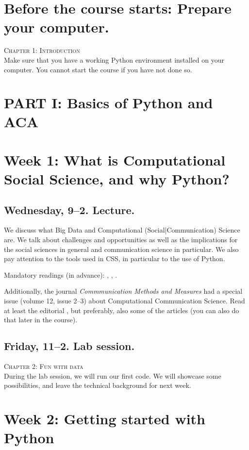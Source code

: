 \section*{Before the course starts: Prepare your computer.}
\textsc{ Chapter 1: Introduction}\\
Make sure that you have a working Python environment installed on your computer. You cannot start the course if you have not done so.

\section*{PART I: Basics of Python and ACA}

\section*{Week 1: What is Computational Social Science, and why Python?}
\subsection*{Wednesday, 9--2. Lecture.}
We discuss what Big Data and Computational (Social|Communication) Science are. We talk about challenges and opportunities as well as the implications for the social sciences in general and communication science in particular. We also pay attention to the tools used in CSS, in particular to the use of Python.

Mandatory readings (in advance):  \cite{boyd2012}, \cite{Kitchin2014}, \cite{Hilbert2019}.

Additionally, the journal \textit{Commmunication Methods and Measures} had a special issue (volume 12, issue 2--3) about Computational Communication Science. Read at least the editorial \citep{VanAtteveldt2018a}, but preferably, also some of the articles (you can also do that later in the course).


\subsection*{Friday, 11--2. Lab session.}
\textsc{ Chapter 2: Fun with data}\\

During the lab session, we will run our first code. We will showcase some possibilities, and leave the technical background for next week.




\section*{Week 2: Getting started with Python}

